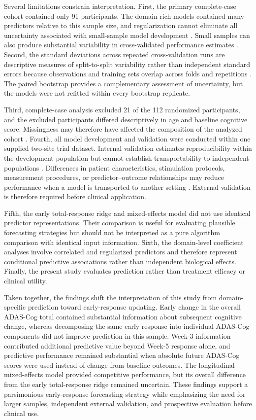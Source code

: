 \documentclass[11pt]{article}
\begin{document}
Several limitations constrain interpretation. First, the primary complete-case cohort contained only 91 participants. The domain-rich models contained many predictors relative to this sample size, and regularization cannot eliminate all uncertainty associated with small-sample model development \citep{riley2019continuous}. Small samples can also produce substantial variability in cross-validated performance estimates \citep{varoquaux2018crossvalidation}. Second, the standard deviations across repeated cross-validation runs are descriptive measures of split-to-split variability rather than independent standard errors because observations and training sets overlap across folds and repetitions \citep{bengio2004variance}. The paired bootstrap provides a complementary assessment of uncertainty, but the models were not refitted within every bootstrap replicate.

Third, complete-case analysis excluded 21 of the 112 randomized participants, and the excluded participants differed descriptively in age and baseline cognitive score. Missingness may therefore have affected the composition of the analyzed cohort \citep{sterne2009missing}. Fourth, all model development and validation were conducted within one supplied two-site trial dataset. Internal validation estimates reproducibility within the development population but cannot establish transportability to independent populations \citep{ramspek2021external}. Differences in patient characteristics, stimulation protocols, measurement procedures, or predictor--outcome relationships may reduce performance when a model is transported to another setting \citep{subbaswamy2020shift}. External validation is therefore required before clinical application.

Fifth, the early total-response ridge and mixed-effects model did not use identical predictor representations. Their comparison is useful for evaluating plausible forecasting strategies but should not be interpreted as a pure algorithm comparison with identical input information. Sixth, the domain-level coefficient analyses involve correlated and regularized predictors and therefore represent conditional predictive associations rather than independent biological effects. Finally, the present study evaluates prediction rather than treatment efficacy or clinical utility. 

Taken together, the findings shift the interpretation of this study from domain-specific prediction toward early-response updating. Early change in the overall ADAS-Cog total contained substantial information about subsequent cognitive change, whereas decomposing the same early response into individual ADAS-Cog components did not improve prediction in this sample. Week-3 information contributed additional predictive value beyond Week-5 response alone, and predictive performance remained substantial when absolute future ADAS-Cog scores were used instead of change-from-baseline outcomes. The longitudinal mixed-effects model provided competitive performance, but its overall difference from the early total-response ridge remained uncertain. These findings support a parsimonious early-response forecasting strategy while emphasizing the need for larger samples, independent external validation, and prospective evaluation before clinical use.
\end{document}

